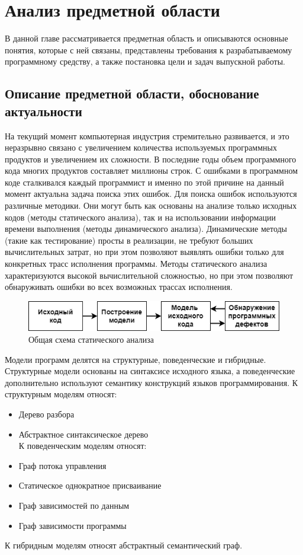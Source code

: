 \chapter{Анализ предметной области} \label{ch1}
В данной главе рассматривается предметная область и описываются основные понятия, которые с ней связаны, представлены требования к разрабатываемому программному средству, а также постановка цели и задач выпускной работы.
\section{Описание предметной области, обоснование актуальности} \label{ch1:sec1}

На текущий момент компьютерная индустрия стремительно развивается, и это неразрывно связано с увеличением количества используемых программных продуктов и увеличением их сложности. В последние годы объем программного кода многих продуктов составляет миллионы строк.
С ошибками в программном коде сталкивался каждый программист и именно по этой причине на данный момент актуальна задача поиска этих ошибок.
Для поиска ошибок используются различные методики. Они могут быть как основаны на анализе только исходных кодов (методы статического анализа), так и на использовании информации времени выполнения (методы динамического анализа).
Динамические методы (такие как тестирование) просты в реализации, не требуют больших вычислительных затрат, но при этом позволяют выявлять ошибки только для конкретных трасс исполнения программы. 
Методы статического анализа характеризуются высокой вычислительной сложностью, но при этом позволяют обнаруживать ошибки во всех возможных трассах исполнения.\\

\begin{figure}[h]
	\center
	\includegraphics [scale=1] {my_folder/images/my/1}
	\caption{Общая схема статического анализа} 
	\label{fig:1}  
\end{figure}

Модели программ делятся на структурные, поведенческие и гибридные. Структурные модели основаны на синтаксисе исходного языка, а поведенческие дополнительно используют семантику конструкций языков программирования.
К структурным моделям относят:
\begin{itemize}
\item Дерево разбора 
\item Абстрактное синтаксическое дерево\\
К поведенческим моделям относят:
\item Граф потока управления 
\item Статическое однократное присваивание
\item Граф зависимостей по данным
\item Граф зависимости программы
\end{itemize}
	К гибридным моделям относят абстрактный семантический граф.
